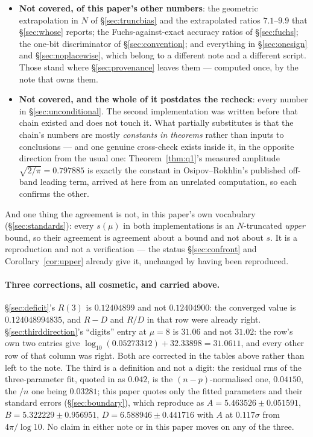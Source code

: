 \documentclass[11pt,a4paper]{article}
\theoremstyle{plain}
\theoremstyle{definition}
\theoremstyle{remark}
\newcommand{\file}[1]{\path{#1}}
\begin{document}
\begin{itemize}
the recheck leaves unverified in exactly the same way.
\item \textbf{Not covered, of this paper's other numbers}: the geometric
extrapolation in $N$ of \S\ref{sec:truncbias} and the extrapolated ratios
$7.1$--$9.9$ that \S\ref{sec:whose} reports; the Fuchs-against-exact accuracy
ratios of \S\ref{sec:fuchs}; the one-bit discriminator of
\S\ref{sec:convention}; and everything in \S\ref{sec:onesign} and
\S\ref{sec:noplacewise}, which belong to a different note and a different
script.  Those stand where \S\ref{sec:provenance} leaves them --- computed once,
by the note that owns them.
\item \textbf{Not covered, and the whole of it postdates the recheck}: every
number in \S\ref{sec:unconditional}.  The second implementation was written
before that chain existed and does not touch it.  What partially substitutes is
that the chain's numbers are mostly \emph{constants in theorems} rather than
inputs to conclusions --- and one genuine cross-check exists inside it, in the
opposite direction from the usual one: Theorem~\ref{thm:q1}'s measured amplitude
$\sqrt{2/\pi}=0.797885$ is exactly the constant in Osipov--Rokhlin's published
off-band leading term, arrived at here from an unrelated computation, so each
confirms the other.
\end{itemize}

\noindent And one thing the agreement is not, in this paper's own vocabulary
(\S\ref{sec:standards}): every $s(\mu)$ in both implementations is an
$N$-truncated \emph{upper} bound, so their agreement is agreement about a bound
and not about $s$.  It is a reproduction and not a verification --- the status
\S\ref{sec:confront} and Corollary~\ref{cor:upper} already give it, unchanged by
having been reproduced.

\paragraph{Three corrections, all cosmetic, and carried above.}
\S\ref{sec:deficit}'s $R(3)$ is $0.12404899$ and not $0.12404900$: the converged
value is $0.124048994835$, and $R-D$ and $R/D$ in that row were already right.
\S\ref{sec:thirddirection}'s ``digits'' entry at $\mu=8$ is $31.06$ and not
$31.02$: the row's own two entries give $\log_{10}(0.05273312)+32.33898=31.0611$,
and every other row of that column was right.  Both are corrected in the tables
above rather than left to the note.  The third is a definition and not a digit:
the residual rms of the three-parameter fit, quoted in \file{deficit-repair.md}
as $0.042$, is the $(n-p)$-normalised one, $0.04150$, the $/n$ one being
$0.03281$; this paper quotes only the fitted parameters and their standard
errors (\S\ref{sec:boundary}), which reproduce as
$A=5.463526\pm0.051591$, $B=5.322229\pm0.956951$, $D=6.588946\pm0.441716$ with
$A$ at $0.117\sigma$ from $4\pi/\log10$.  No claim in either note or in this
paper moves on any of the three.
\end{document}
